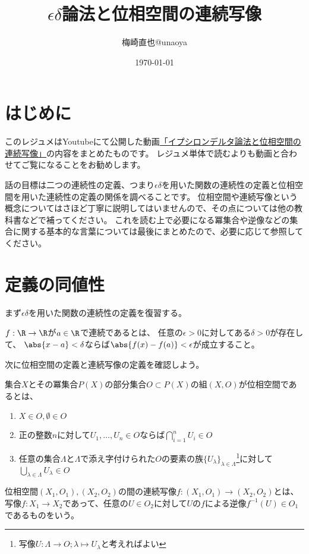 \documentclass[uplatex]{jsarticle}
\title{$\epsilon\delta$論法と位相空間の連続写像}
\author{梅崎直也@unaoya}
\date{\today}
\begin{document}
\maketitle

\section{はじめに}
このレジュメはYoutubeにて公開した動画\href{https://youtu.be/UCjC3USiSJM}{「イプシロンデルタ論法と位相空間の連続写像」}の内容をまとめたものです。
レジュメ単体で読むよりも動画と合わせてご覧になることをお勧めします。

話の目標は二つの連続性の定義、つまり$\epsilon\delta$を用いた関数の連続性の定義と位相空間を用いた連続性の定義の関係を調べることです。
位相空間や連続写像という概念についてはさほど丁寧に説明してはいませんので、その点については他の教科書などで補ってください。
これを読む上で必要になる冪集合や逆像などの集合に関する基本的な言葉については最後にまとめたので、必要に応じて参照してください。

\section{定義の同値性}
まず$\epsilon\delta$を用いた関数の連続性の定義を復習する。

\begin{dfn}[関数の連続性]
  $f:\R \to \R$が$a\in\R$で連続であるとは、
  任意の$\epsilon>0$に対してある$\delta>0$が存在して、
  $\abs{x-a}<\delta$ならば$\abs{f(x)-f(a)}<\epsilon$が成立すること。
\end{dfn}

次に位相空間の定義と連続写像の定義を確認しよう。

\begin{dfn}[位相空間]
  集合$X$とその冪集合$P(X)$の部分集合$O\subset P(X)$の組$(X,O)$が位相空間であるとは、
  \begin{enumerate}
  \item $X\in O, \emptyset\in O$
  \item 正の整数$n$に対して$U_1,\ldots,U_n\in O$ならば$\bigcap_{i=1}^n U_i\in O$
  \item 任意の集合$\Lambda$と$\Lambda$で添え字付けられた$O$の要素の族$\{U_\lambda\}_{\lambda\in\Lambda}$\footnote{写像$U:\Lambda\to O; \lambda\mapsto U_\lambda$と考えればよい}に対して$\bigcup_{\lambda\in\Lambda}U_\lambda\in O$
  \end{enumerate}
\end{dfn}

\begin{dfn}[位相空間の間の連続写像]
  位相空間$(X_1,O_1), (X_2,O_2)$の間の連続写像$f:(X_1,O_1)\to(X_2,O_2)$とは、
  写像$f:X_1\to X_2$であって、任意の$U\in O_2$に対して$U$の$f$による逆像$f^{-1}(U)\in O_1$であるものをいう。
\end{dfn}
\end{document}
